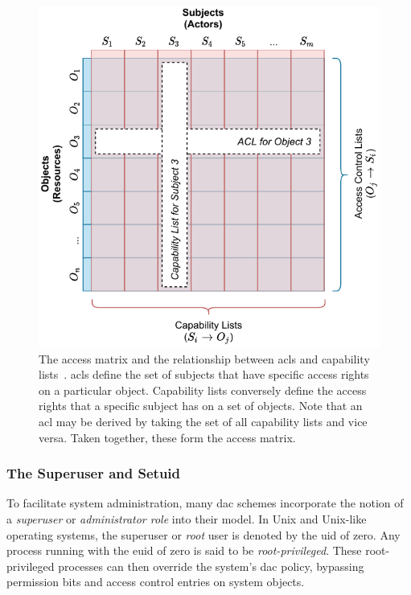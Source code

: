 \documentclass[
  fontsize=12pt,
  titlepage=firstiscover,
  paper=letter,
oneside,
  cleardoublepage=plain,
  parskip=half-,
  DIV=10,
  parindent,
  appendixprefix,
  chapterprefix,
  listof=totoc,
]{scrbook}
\begin{document}
\begin{figure}[htbp]
  \centering
  \includegraphics[width=0.8\linewidth]{figs/background/acl.pdf}
  \caption[The access matrix]{
    The access matrix and the relationship between \glspl{acl} and capability
    lists~\cite{anderson1972_report, van_oorschot2020_tools_jewels,
    jaeger2008_os_security}. \glspl{acl} define the set of subjects that have specific
    access rights on a particular object. Capability lists conversely define the access
    rights that a specific subject has on a set of objects. Note that an \gls{acl} may be
    derived by taking the set of all capability lists and vice versa. Taken together,
    these form the access matrix.
  }\label{fig:acl}
\end{figure}

\subsubsection*{The Superuser and Setuid}

To facilitate system administration, many \gls{dac} schemes incorporate the notion of
a \textit{superuser} or \textit{administrator role} into their model. In Unix and
Unix-like operating systems, the superuser or \textit{root} user is denoted by the
\gls{uid} of zero. Any process running with the \gls{euid} of zero is said to be
\textit{root-privileged}. These root-privileged processes can then override the system's
\gls{dac} policy, bypassing permission bits and access control entries on system objects.
\end{document}

